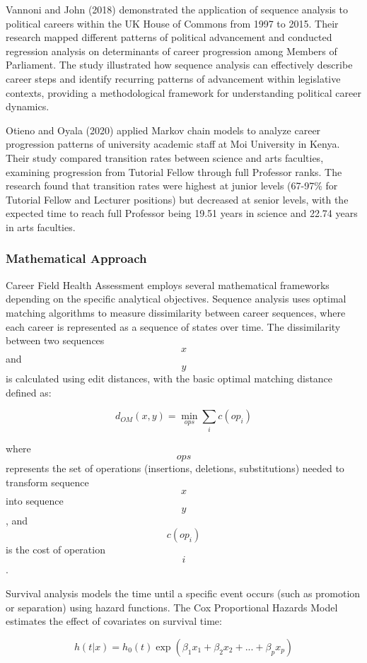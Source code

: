 \documentclass[main.tex]{subfiles}
\begin{document}
Vannoni and John (2018) demonstrated the application of sequence analysis to political careers within the UK House of Commons from 1997 to 2015. Their research mapped different patterns of political advancement and conducted regression analysis on determinants of career progression among Members of Parliament. The study illustrated how sequence analysis can effectively describe career steps and identify recurring patterns of advancement within legislative contexts, providing a methodological framework for understanding political career dynamics\parencite{vannoni2018}.

Otieno and Oyala (2020) applied Markov chain models to analyze career progression patterns of university academic staff at Moi University in Kenya. Their study compared transition rates between science and arts faculties, examining progression from Tutorial Fellow through full Professor ranks. The research found that transition rates were highest at junior levels (67-97\% for Tutorial Fellow and Lecturer positions) but decreased at senior levels, with the expected time to reach full Professor being 19.51 years in science and 22.74 years in arts faculties\parencite{otieno2020}.

\subsubsection{Mathematical Approach}

Career Field Health Assessment employs several mathematical frameworks depending on the specific analytical objectives. Sequence analysis uses optimal matching algorithms to measure dissimilarity between career sequences, where each career is represented as a sequence of states over time. The dissimilarity between two sequences $$x$$ and $$y$$ is calculated using edit distances, with the basic optimal matching distance defined as:

$$d_{OM}(x,y) = \min_{ops} \sum_{i} c(op_i)$$

where $$ops$$ represents the set of operations (insertions, deletions, substitutions) needed to transform sequence $$x$$ into sequence $$y$$, and $$c(op_i)$$ is the cost of operation $$i$$\parencite{abbott1995}.

Survival analysis models the time until a specific event occurs (such as promotion or separation) using hazard functions. The Cox Proportional Hazards Model estimates the effect of covariates on survival time:

$$h(t|x) = h_0(t) \exp(\beta_1 x_1 + \beta_2 x_2 + ... + \beta_p x_p)$$
\end{document}

